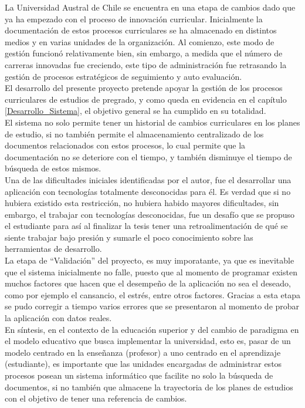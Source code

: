 La Universidad Austral de Chile se encuentra en una etapa de cambios dado que ya ha empezado con
el proceso de innovación curricular.  Inicialmente la documentación de estos procesos curriculares  se ha almacenado en distintos medios y en varias unidades de la organización. Al comienzo, este modo de gestión  funcionó relativamente bien, sin embargo, a  medida que el número de carreras innovadas fue creciendo,  este tipo de administración  fue retrasando la gestión de procesos estratégicos de seguimiento y auto evaluación.
\\


El desarrollo del presente proyecto  pretende apoyar la gestión de los procesos curriculares de estudios de pregrado, y como queda en evidencia en el  capítulo \ref{Desarrollo_Sistema}, el objetivo general se ha cumplido en su totalidad.
\\

El sistema no solo permite tener un historial de cambios curriculares en los planes de estudio, si no también permite el almacenamiento centralizado de los documentos relacionados con estos procesos, lo cual permite  que la documentación no se deteriore con el tiempo, y también disminuye el tiempo de búsqueda de estos mismos.\\

Una de las dificultades iniciales identificadas por el autor, fue el desarrollar una aplicación con tecnologías totalmente desconocidas para él. Es verdad que si no hubiera existido esta restricción, no hubiera habido mayores dificultades, sin embargo, el trabajar con tecnologías desconocidas, fue un desafío que se propuso el estudiante para así al finalizar la tesis tener una retroalimentación de qué se siente trabajar bajo presión y sumarle el poco conocimiento sobre las herramientas de desarrollo.
\\ 


La  etapa de ``Validación'' del proyecto, es muy imporatante, ya que es inevitable que el sistema inicialmente no falle, puesto que al momento de programar existen muchos factores que hacen que el desempeño de la aplicación no sea el deseado, como por ejemplo  el cansancio, el estrés, entre otros factores. Gracias a esta etapa se pudo corregir a tiempo varios errores que se presentaron al momento de  probar la aplicación con datos reales.
\\



En síntesis, en el contexto de la educación superior y del cambio de paradigma en el modelo educativo que busca implementar la universidad, esto es, pasar de un modelo centrado en la enseñanza (profesor) a uno centrado en el aprendizaje (estudiante), es importante que las unidades encargadas de administrar estos procesos posean un sistema informático que facilite no solo la búsqueda de documentos, si no también  que almacene la trayectoria de los planes de estudios con el objetivo de tener una referencia de cambios.




